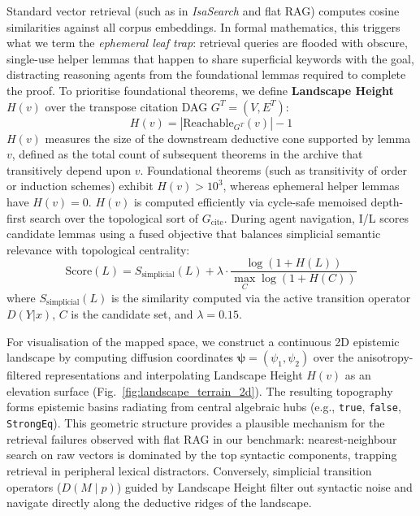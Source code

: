 \documentclass{svproc}
\begin{document}
Standard vector retrieval (such as in \emph{IsaSearch} and flat RAG) computes cosine similarities against all corpus embeddings. In formal mathematics, this triggers what we term the \emph{ephemeral leaf trap}: retrieval queries are flooded with obscure, single-use helper lemmas that happen to share superficial keywords with the goal, distracting reasoning agents from the foundational lemmas required to complete the proof. To prioritise foundational theorems, we define \textbf{Landscape Height} $H(v)$ over the transpose citation DAG $G^T = (V, E^T)$:
\begin{equation}
H(v) = |\text{Reachable}_{G^T}(v)| - 1
\end{equation}
$H(v)$ measures the size of the downstream deductive cone supported by lemma $v$, defined as the total count of subsequent theorems in the archive that transitively depend upon $v$. Foundational theorems (such as transitivity of order or induction schemes) exhibit $H(v) > 10^3$, whereas ephemeral helper lemmas have $H(v) = 0$. $H(v)$ is computed efficiently via cycle-safe memoised depth-first search over the topological sort of $G_{\text{cite}}$. During agent navigation, I/L scores candidate lemmas using a fused objective that balances simplicial semantic relevance with topological centrality:
\begin{equation}
\text{Score}(L) = S_{\text{simplicial}}(L) + \lambda \cdot \frac{\log(1 + H(L))}{\max_{C} \log(1 + H(C))}
\label{eq:fused_rank}
\end{equation}
where $S_{\text{simplicial}}(L)$ is the similarity computed via the active transition operator $D(Y | x)$, $C$ is the candidate set, and $\lambda = 0.15$.

For visualisation of the mapped space, we construct a continuous 2D epistemic landscape by computing diffusion coordinates $\boldsymbol{\psi} = (\psi_1, \psi_2)$ over the anisotropy-filtered representations and interpolating Landscape Height $H(v)$ as an elevation surface (Fig.~\ref{fig:landscape_terrain_2d}). The resulting topography forms epistemic basins radiating from central algebraic hubs (e.g., \texttt{true}, \texttt{false}, \texttt{StrongEq}). This geometric structure provides a plausible mechanism for the retrieval failures observed with flat RAG in our benchmark:
nearest-neighbour search on raw vectors is dominated by the top syntactic components, trapping retrieval in peripheral lexical distractors. Conversely, simplicial transition operators ($D(M \mid p)$) guided by Landscape Height filter out syntactic noise and navigate directly along the deductive ridges of the landscape.
\end{document}
